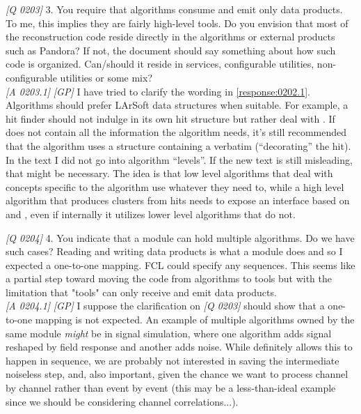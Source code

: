 \emph{{[}Q 0203{]}}\label{question:0203}
3. You require that algorithms consume and emit only data products. To me, this implies they are fairly high-level tools. Do you envision that most of the reconstruction code reside directly in the algorithms or external products such as Pandora? If not, the document should say something about how such code is organized. Can/should it reside in services, configurable utilities, non-configurable utilities or some mix?\\
\emph{{[}A 0203.1{]}} \emph{{[}GP{]}}
I have tried to clarify the wording in \cref{response:0202.1}.
Algorithms should prefer LArSoft data structures when suitable.
For example, a hit finder should not indulge in its own hit structure but rather deal with .
If  does not contain all the information the algorithm needs,
it's still recommended that the algorithm uses a structure containing a  verbatim (``decorating'' the hit).\\
In the text I did not go into algorithm ``levels''. If the new text is still misleading, that might be necessary.
The idea is that low level algorithms that deal with concepts specific to the algorithm use whatever they need to,
while a high level algorithm that produces clusters from hits needs to expose an interface based on  and ,
even if internally it utilizes lower level algorithms that do not.


\emph{{[}Q 0204{]}}
4. You indicate that a module can hold multiple algorithms. Do we have such cases? Reading and writing data products is what a module does and so I expected a one-to-one mapping. FCL could specify any sequences. This seems like a partial step toward moving the code from algorithms to tools but with the limitation that "tools" can only receive and emit data products.\\
\emph{{[}A 0204.1{]}} \emph{{[}GP{]}}
I suppose the clarification on \emph{{[}Q 0203{]}} should show that a one-to-one mapping is not expected.
An example of multiple algorithms owned by the same module \emph{might} be in signal simulation,
where one algorithm adds signal reshaped by field response and another adds noise.
While \ART definitely allows this to happen in sequence,
we are probably not interested in saving the intermediate noiseless step,
and, also important, given the chance we want to process channel by channel rather than event by event
(this may be a less-than-ideal example since we should be considering channel correlations...).


